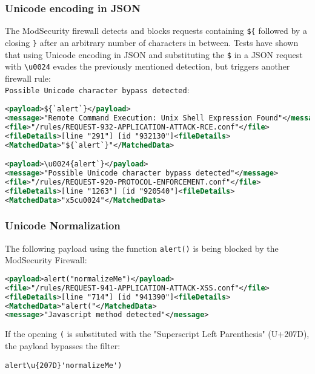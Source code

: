 \subsubsection{Unicode encoding in JSON}
\label{sec:unicodeinjsontest}
The ModSecurity firewall detects and blocks requests containing \verb|${| followed by a closing \verb|}| after an arbitrary number of characters in between.
Tests have shown that using Unicode encoding in JSON and substituting the \verb|$| in a JSON request with \verb|\u0024| evades the previously mentioned detection, but triggers another firewall rule: \\
\verb|Possible Unicode character bypass detected|:

\begin{lstlisting}[style=ruleStyle, language=XML, caption=unicode tests \$\{`alert`\}, label={lst:jsonunicodetests}]
<payload>${`alert`}</payload>
<message>"Remote Command Execution: Unix Shell Expression Found"</message>
<file>"/rules/REQUEST-932-APPLICATION-ATTACK-RCE.conf"</file>
<fileDetails>[line "291"] [id "932130"]<fileDetails>
<MatchedData>"${`alert`}"</MatchedData>

<payload>\u0024{alert`}</payload>
<message>"Possible Unicode character bypass detected"</message>
<file>"/rules/REQUEST-920-PROTOCOL-ENFORCEMENT.conf"</file>
<fileDetails>[line "1263"] [id "920540"]<fileDetails>
<MatchedData>"x5cu0024"</MatchedData>
\end{lstlisting}

\subsubsection{Unicode Normalization}
\label{sec:uninormsingleiter}
The following payload using the function \verb|alert()| is being blocked by the ModSecurity Firewall:

\begin{lstlisting}[style=ruleStyle, language=XML, caption=alert("normalizeMe") blocked, label=lst:alertnormalizemeblocked]
<payload>alert("normalizeMe")</payload>
<file>"/rules/REQUEST-941-APPLICATION-ATTACK-XSS.conf"</file>
<fileDetails>[line "714"] [id "941390"]<fileDetails>
<MatchedData>"alert("</MatchedData>
<message>"Javascript method detected"</message>
\end{lstlisting}

If the opening \verb|(| is substituted with the "Superscript Left Parenthesis" (U+207D), the payload bypasses the filter:

\begin{lstlisting}[style=basicStyle, caption=alert('normalizeMe') bypass, label=lst:alertnormalizemebypass]
alert\u{207D}'normalizeMe')
\end{lstlisting}

